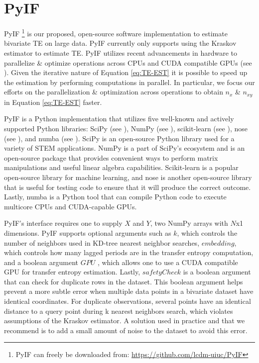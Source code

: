 \section{PyIF}

PyIF \footnote{PyIF can freely be downloaded from: \url{https://github.com/lcdm-uiuc/PyIF}} is our proposed, open-source software implementation to estimate bivariate TE on large data.  PyIF currently only supports using the Kraskov estimator to estimate TE.  PyIF utilizes recent advancements in hardware to parallelize \& optimize operations across CPUs and CUDA compatible GPUs (see  \cite{CUDA}).  Given the iterative nature of Equation \ref{eq:TE-EST} it is possible to speed up the estimation by performing computations in parallel. In particular, we focus our efforts on the parallelization \& optimization across operations to obtain \(n_x\)  \& \(n_{xy}\) in Equation \ref{eq:TE-EST} faster.



PyIF is a Python implementation that utilizes five well-known and actively supported Python libraries: SciPy (see \cite{scipy}),  NumPy (see \cite{numpy}), scikit-learn (see \cite{scikit-learn}),  nose (see \cite{nose}), and numba (see \cite{numba}).  SciPy is an open-source Python library used for a variety of STEM applications.  NumPy is a part of SciPy's ecosystem and is an open-source package that provides convenient ways to perform matrix manipulations and useful linear algebra capabilities.  Scikit-learn is a popular open-source library for machine learning, and nose is another open-source library that is useful for testing code to ensure that it will produce the correct outcome.  Lastly, numba is a Python tool that can compile Python code to execute multicore CPUs and CUDA-capable GPUs.


PyIF's interface requires one to supply \(X\) and \(Y\), two NumPy arrays with \(N\)x1 dimensions.  PyIF supports optional arguments such as \(k\), which controls the number of neighbors used in KD-tree nearest neighbor searches,  \(embedding\), which controls how many lagged periods are in the transfer entropy computation, and a boolean argument \(GPU\) , which allows one to use a CUDA compatible GPU for transfer entropy estimation.  Lastly, \(safetyCheck\) is a boolean argument that can check for duplicate rows in the dataset. This boolean argument helps prevent a more subtle error when multiple data points in a bivariate dataset have identical coordinates. For duplicate observations, several points have an identical distance to a query point during k nearest neighbors search, which violates assumptions of the Kraskov estimator. A solution used in practice and that we recommend is to add a small amount of noise to the dataset to avoid this error.


